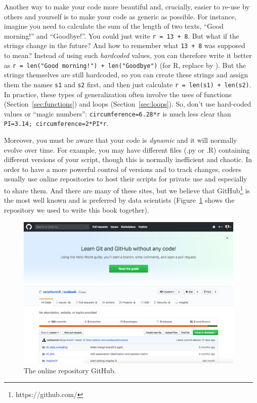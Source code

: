 Another way to make your code more beautiful and, crucially, easier to re-use by others and yourself is to make your code as generic as possible.
For instance, imagine you need to calculate the sum of the length of two texts, ``Good morning!'' and ``Goodbye!''.
You could just write \verb|r = 13 + 8|. But what if the strings change in the future? And how to remember what \verb|13 + 8| was supposed to mean?
Instead of using such \emph{hardcoded} values, you can therefore write it better as \verb|r = len("Good morning!") + len("Goodbye")| (for R, replace  by ).
But the strings themselves are still hardcoded, so you can  create these strings and assign them the names \verb|s1| and \verb|s2| first, and then just calculate \verb|r = len(s1) + len(s2)|. In practice, these types of generalization often involve the uses of functions (Section~\ref{sec:functions}) and loops (Section~\ref{sec:loops}). So, don't use hard-coded values or ``magic numbers'': \verb+circumference=6.28*r+ is much less clear than \verb+PI=3.14; circumference=2*PI*r+.

Moreover, you must be aware that your code is \textit{dynamic} and it will normally evolve over time. For example, you may have different files (.py or .R) containing different versions of your script, though this is normally inefficient and chaotic. In order to have a more powerful control of versions and to track changes, coders usually use online repositories to host their scripts for private use and especially to share them. And there are many of these sites, but we believe that GitHub\footnote{https://github.com/} is the most well known and is preferred by data scientists (Figure~\ref{fig:github} shows the repository we used to write this book together).

\begin{figure}
\centering
\includegraphics[width=0.9\linewidth]{figures/ch04_github.png}
\caption{The online repository GitHub.}
\label{fig:github}
\end{figure}

